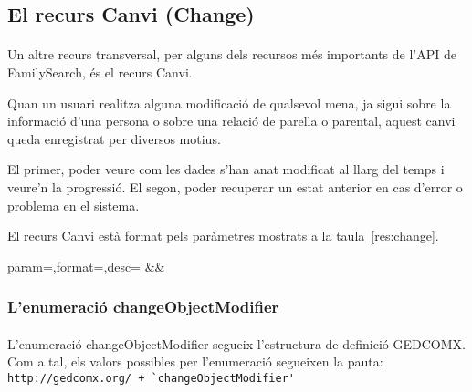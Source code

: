 \subsection{El recurs Canvi (Change)}

    \paragraph{}
    Un altre recurs transversal, per alguns dels recursos més importants de l'API de FamilySearch, és el recurs Canvi.

    Quan un usuari realitza alguna modificació de qualsevol mena, ja sigui sobre la informació d'una persona o sobre una relació de parella o parental, aquest canvi queda enregistrat per diversos motius.

    El primer, poder veure com les dades s'han anat modificat al llarg del temps i veure'n la progressió. El segon, poder recuperar un estat anterior en cas d'error o problema en el sistema.

    El recurs Canvi està format pels paràmetres mostrats a la taula~\ref{res:change}.

    \begin{center}
             {param=\param,format=\format,desc=\desc}
             {\param&\format&\desc}
     \end{center}


     \subsubsection{L'enumeració changeObjectModifier}

     \paragraph{}
     L'enumeració changeObjectModifier segueix l'estructura de definició GEDCOMX. Com a tal, els valors possibles per l'enumeració segueixen la pauta:\\\verb|http://gedcomx.org/ + `changeObjectModifier'|

